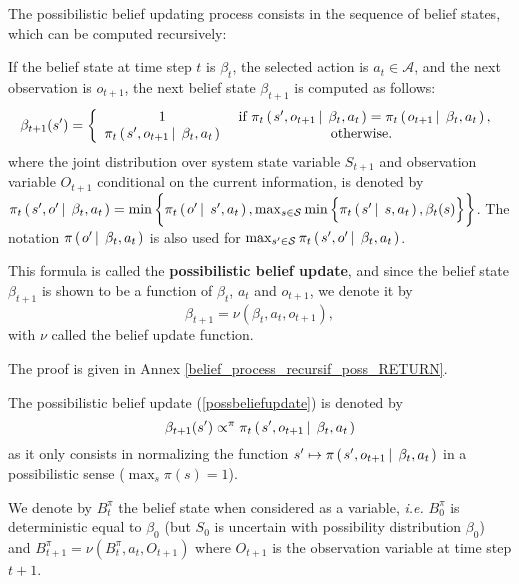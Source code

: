 The possibilistic belief updating process consists in the sequence of belief states,
which can be computed recursively: 
\begin{theorem}
\label{belief_process_recursif_poss}
If the belief state at time step $t$ is $\beta_t$,
the selected action is $a_t \in \mathcal{A}$,
and the next observation is $o_{t+1}$, 
the next belief state $\beta_{t+1}$ is computed as follows:
\begin{equation}
\label{possbeliefupdate}
\beta_{t+1}(s') = \left \{ \begin{array}{ccc}
1 & \mbox{ if } \pi_t \left( \left.  s', o_{t+1} \, \right| \left. \, \beta_t, a_t \right. \right)= \pi_t \left( \left.  o_{t+1} \, \right| \left. \, \beta_t,a_t  \right. \right), \\
\pi_t \left( \left.  s', o_{t+1} \, \right| \left. \, \beta_t, a_t \right. \right) & \mbox{ otherwise. } 
\end{array} \right.
\end{equation}
where the joint distribution over system state variable $S_{t+1}$
and observation variable $O_{t+1}$ conditional on the current information, 
is denoted by $\pi_t \left( \left.  s', o' \, \right| \left. \, \beta_t, a_t \right. \right) 
= \min \bigg\{ \pi_{t} \left( \left. o' \, \right| \left. \, s', a_t \right. \right),  \max_{s \in \mathcal{S}} \min \Big\{ \pi_t \left( \left.  s' \, \right| \left. \, s, a_t  \right. \right), \beta_t(s) \Big\} \bigg\}$. 
The notation $\pi \left( \left.  o' \, \right| \left. \, \beta_t, a_t \right. \right)$ is also used for $\max_{s' \in \mathcal{S}} \pi_t \left( \left.  s', o' \, \right| \left. \, \beta_t, a_t \right. \right)$. 

This formula is called the \textbf{possibilistic belief update},
and since the belief state $\beta_{t+1}$ is shown to be a function of $\beta_t$, $a_t$ and $o_{t+1}$,
we denote it by \[ \beta_{t+1} = \nu(\beta_t,a_t,o_{t+1}),\]
with $\nu$ called the belief update function.
\end{theorem}
The proof is given in Annex \ref{belief_process_recursif_poss_RETURN}.

The possibilistic belief update (\ref{possbeliefupdate}) is denoted by
\[ \beta_{t+1}(s') \propto^{\pi} \pi_t \left( \left.  s', o_{t+1} \, \right| \left. \, \beta_t, a_t \right. \right) \]
as it only consists in normalizing the function 
$s' \mapsto \pi \left( \left.  s',o_{t+1} \, \right| \left. \, \beta_t,a_t  \right. \right)$
in a possibilistic sense ($\max_{s} \pi(s) = 1$).

We denote by $B^{\pi}_t$ the belief state when considered as a variable,
\textit{i.e.} $B^{\pi}_0$ is deterministic equal to $\beta_0$
(but $S_0$ is uncertain with possibility distribution $\beta_0$)
and $B^{\pi}_{t+1} = \nu(B^{\pi}_t,a_t,O_{t+1})$
where $O_{t+1}$ is the observation variable at time step $t+1$.

